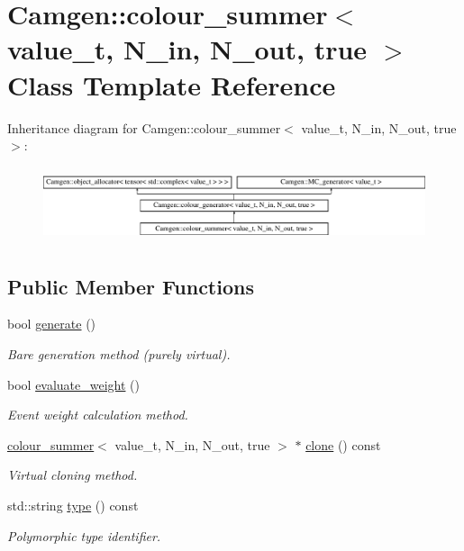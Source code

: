\hypertarget{a00089}{}\section{Camgen\+:\+:colour\+\_\+summer$<$ value\+\_\+t, N\+\_\+in, N\+\_\+out, true $>$ Class Template Reference}
\label{a00089}
Inheritance diagram for Camgen\+:\+:colour\+\_\+summer$<$ value\+\_\+t, N\+\_\+in, N\+\_\+out, true $>$\+:\begin{figure}[H]
\begin{center}
\leavevmode
\includegraphics[height=2.222222cm]{a00089}
\end{center}
\end{figure}
\subsection*{Public Member Functions}
\begin{DoxyCompactItemize}
\item 
bool \hyperlink{a00089_acba619ff44c605c484d747495804b2ef}{generate} ()
\begin{DoxyCompactList}\small\item\em \textquotesingle{}Bare generation\textquotesingle{} method (purely virtual). \end{DoxyCompactList}\item 
\hypertarget{a00089_a54ef0344eb5ea83bae116de67cef88db}{}bool \hyperlink{a00089_a54ef0344eb5ea83bae116de67cef88db}{evaluate\+\_\+weight} ()\label{a00089_a54ef0344eb5ea83bae116de67cef88db}

\begin{DoxyCompactList}\small\item\em Event weight calculation method. \end{DoxyCompactList}\item 
\hypertarget{a00089_a3fd07aca293519580f410a0f96f7966b}{}\hyperlink{a00087}{colour\+\_\+summer}$<$ value\+\_\+t, N\+\_\+in, N\+\_\+out, true $>$ $\ast$ \hyperlink{a00089_a3fd07aca293519580f410a0f96f7966b}{clone} () const \label{a00089_a3fd07aca293519580f410a0f96f7966b}

\begin{DoxyCompactList}\small\item\em Virtual cloning method. \end{DoxyCompactList}\item 
\hypertarget{a00089_aa24d7210b2e5ddb1c6553d0394f0722b}{}std\+::string \hyperlink{a00089_aa24d7210b2e5ddb1c6553d0394f0722b}{type} () const \label{a00089_aa24d7210b2e5ddb1c6553d0394f0722b}

\begin{DoxyCompactList}\small\item\em Polymorphic type identifier. \end{DoxyCompactList}\end{DoxyCompactItemize}
